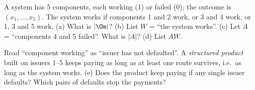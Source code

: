 
\begin{problem}
	A system has 5 components, each working (1) or failed (0); the outcome is
	$(x_1,\dots,x_5)$. The system works if components 1 and 2 work, or 3 and 4
	work, or 1, 3 and 5 work. (a) What is $|\Om|$? (b) List $W$ = ``the system
	works''. (c) Let $A$ = ``components 4 and 5 failed''. What is $|A|$?
	(d) List $AW$.
	\begin{context}
		Read ``component working'' as ``issuer has not defaulted''. A
		\emph{structured product} built on issuers 1--5 keeps paying as long as at
		least one route survives, i.e.\ as long as the system works. (e) Does the
		product keep paying if any single issuer defaults? Which pairs of defaults
		stop the payments?
	\end{context}
\end{problem}

